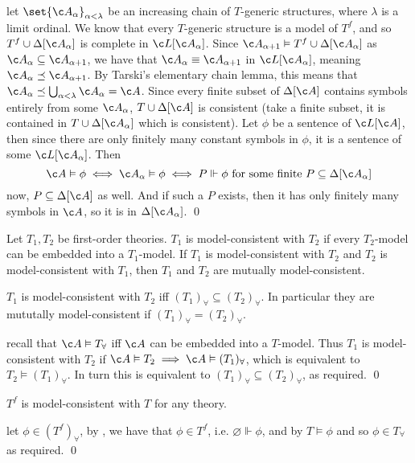 \Proof let $\set{\c A_\alpha}_{\alpha<\lambda}$ be an increasing chain of $T$-generic structures, where $\lambda$ is a limit ordinal.
We know that every $T$-generic structure is a model of $T^f$, and so $T^f\cup\Delta[\c A_\alpha]$ is complete in $\c L[\c A_\alpha]$.
Since $\c A_{\alpha+1}\vDash T^f\cup\Delta[\c A_\alpha]$ as $\c A_{\alpha}\subseteq\c A_{\alpha+1}$, we have that $\c A_\alpha\equiv\c A_{\alpha+1}$ in $\c L[\c A_\alpha]$, meaning
$\c A_\alpha\preceq\c A_{\alpha+1}$.
By Tarski's elementary chain lemma, this means that $\c A_\alpha\preceq\bigcup_{\alpha<\lambda}\c A_\alpha=\c A$.
Since every finite subset of $\Delta[\c A]$ contains symbols entirely from some $\c A_\alpha$, $T\cup\Delta[\c A]$ is consistent (take a finite subset, it is contained in $T\cup\Delta[\c A_\alpha]$ which
is consistent).
Let $\phi$ be a sentence of $\c L[\c A]$, then since there are only finitely many constant symbols in $\phi$, it is a sentence of some $\c L[\c A_\alpha]$.
Then
$$ \c A\vDash\phi \iff \c A_\alpha\vDash\phi \iff P\Vdash\phi\hbox{ for some finite $P\subseteq\Delta[\c A_\alpha]$} $$
now, $P\subseteq\Delta[\c A]$ as well.
And if such a $P$ exists, then it has only finitely many symbols in $\c A$, so it is in $\Delta[\c A_\alpha]$.
\qed

\bdefn

    Let $T_1,T_2$ be first-order theories.
    $T_1$ is {\emphcolor model-consistent} with $T_2$ if every $T_2$-model can be embedded into a $T_1$-model.
    If $T_1$ is model-consistent with $T_2$ and $T_2$ is model-consistent with $T_1$, then $T_1$ and $T_2$ are {\emphcolor mutually model-consistent}.

\edefn

\blemm

    $T_1$ is model-consistent with $T_2$ iff $(T_1)_\forall\subseteq(T_2)_\forall$.
    In particular they are mututally model-consistent if $(T_1)_\forall=(T_2)_\forall$.

\elemm

\Proof recall that $\c A\vDash T_\forall$ iff $\c A$ can be embedded into a $T$-model.
Thus $T_1$ is model-consistent with $T_2$ if $\c A\vDash T_2\implies\c A\vDash(T_1)_\forall$, which is equivalent to $T_2\vDash(T_1)_\forall$.
In turn this is equivalent to $(T_1)_\forall\subseteq(T_2)_\forall$, as required.
\qed

\blemm

    $T^f$ is model-consistent with $T$ for any theory.

\elemm

\Proof let $\phi\in(T^f)_\forall$, by , we have that $\phi\in T^f$, i.e. $\varnothing\Vdash\phi$, and by  $T\vDash\phi$ and so $\phi\in T_\forall$ as required.
\qed

